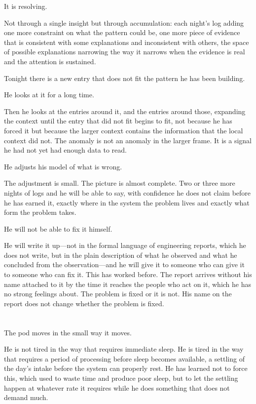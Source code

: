 It is resolving.

Not through a single insight but through
accumulation: each night's log adding one
more constraint on what the pattern could be,
one more piece of evidence that is consistent
with some explanations and inconsistent with
others, the space of possible explanations
narrowing the way it narrows when the evidence
is real and the attention is sustained.

Tonight there is a new entry that does not fit
the pattern he has been building.

He looks at it for a long time.

Then he looks at the entries around it, and
the entries around those, expanding the context
until the entry that did not fit begins to fit,
not because he has forced it but because the
larger context contains the information that
the local context did not. The anomaly is not
an anomaly in the larger frame. It is a signal
he had not yet had enough data to read.

He adjusts his model of what is wrong.

The adjustment is small. The picture is almost
complete. Two or three more nights of logs and
he will be able to say, with confidence he
does not claim before he has earned it, exactly
where in the system the problem lives and
exactly what form the problem takes.

He will not be able to fix it himself.

He will write it up---not in the formal language
of engineering reports, which he does not write,
but in the plain description of what he observed
and what he concluded from the observation---and
he will give it to someone who can give it to
someone who can fix it. This has worked before.
The report arrives without his name attached to
it by the time it reaches the people who act on it,
which he has no strong feelings about. The problem
is fixed or it is not. His name on the report
does not change whether the problem is fixed.

\section{}

The pod moves in the small way it moves.

He is not tired in the way that requires
immediate sleep. He is tired in the way that
requires a period of processing before sleep
becomes available, a settling of the day's
intake before the system can properly rest.
He has learned not to force this, which used
to waste time and produce poor sleep, but to
let the settling happen at whatever rate it
requires while he does something that does not
demand much.

